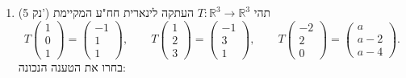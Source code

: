 \documentclass[12pt, a4paper]{article}
\newcommand{\points}[1]{(#1 נק') }
\begin{document}
\begin{enumerate}
את סעיף (ב) נוכל לפסול עם אותה
$A$,כי עבור
$b=\begin{pmatrix}
    1\\0\\
\end{pmatrix}$
לממ״ל 
$Ax=b$
אין פתרון.

מהנתון נסיק לאחר דירוג של
$A$
נקבל כי יש לפחות משתנה חפשי אחד, ולכן לכל
$b$
שנקח, לממ״ל
$Ax=b$
לא יהיה פתרון יחיד. מצד שני, לכל
$b$
שנקח עבורה יש פתרון לממ״ל
$Ax=b$
(למשל, כל
$b$
במרחב העמודות של
$A$)
יהיו אוטומטית אינסוף פתרונות, כמבוקש.
לסיום, קיים
$b$
כזה שהוא שונה מאפס, כי המטריצה
$A$
שונה ממטריצת האפס.



\noindent\rule{\textwidth-30pt}{0.4pt}


\item\points{5}
תהי $T:\mathbb{R}^3\to\mathbb{R}^3$ העתקה לינארית חח"ע המקיימת
\[
T\!\begin{pmatrix}1\\0\\1\end{pmatrix}=\begin{pmatrix}-1\\1\\1\end{pmatrix},
\qquad
T\!\begin{pmatrix}1\\2\\3\end{pmatrix}=\begin{pmatrix}-1\\3\\1\end{pmatrix},
\qquad
T\!\begin{pmatrix}-2\\2\\0\end{pmatrix}=\begin{pmatrix}a\\a-2\\ a-4 \end{pmatrix}.
\]
בחרו את הטענה הנכונה:

\begin{enumerate}
\end{enumerate}


\end{enumerate}
\end{document}
